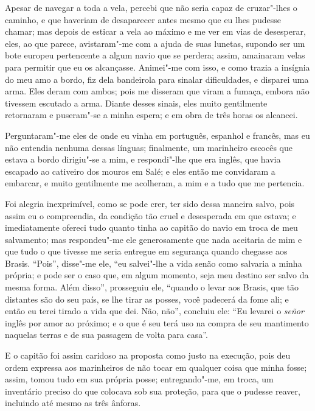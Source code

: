 Apesar de navegar a toda a vela, percebi que não seria capaz de
cruzar"-lhes o caminho, e que haveriam de desaparecer antes mesmo que eu
lhes pudesse chamar; mas depois de esticar a vela ao máximo e me ver em
vias de desesperar, eles, ao que parece, avistaram"-me com a ajuda de
suas lunetas, supondo ser um bote europeu pertencente a algum navio que
se perdera; assim, amainaram velas para permitir que eu os alcançasse.
Animei"-me com isso, e como trazia a insígnia do meu amo a bordo, fiz
dela bandeirola para sinalar dificuldades, e disparei uma arma. Eles
deram com ambos; pois me disseram que viram a fumaça, embora não
tivessem escutado a arma. Diante desses sinais, eles muito gentilmente
retornaram e puseram"-se a minha espera; e em obra de três horas os
alcancei.

Perguntaram"-me eles de onde eu vinha em português, espanhol e francês,
mas eu não entendia nenhuma dessas línguas; finalmente, um marinheiro
escocês que estava a bordo dirigiu"-se a mim, e respondi"-lhe que era
inglês, que havia escapado ao cativeiro dos mouros em Salé; e eles então
me convidaram a embarcar, e muito gentilmente me acolheram, a mim e a
tudo que me pertencia.

Foi alegria inexprimível, como se pode crer, ter sido dessa maneira
salvo, pois assim eu o compreendia, da condição tão cruel e desesperada
em que estava; e imediatamente ofereci tudo quanto tinha ao capitão do
navio em troca de meu salvamento; mas respondeu"-me ele generosamente que
nada aceitaria de mim e que tudo o que tivesse me seria entregue em
segurança quando chegasse aos Brasis. ``Pois'', disse"-me ele, ``eu
salvei"-lhe a vida senão como salvaria a minha própria; e pode ser o caso
que, em algum momento, seja meu destino ser salvo da mesma forma. Além
disso'', prosseguiu ele, ``quando o levar aos Brasis, que tão distantes
são do seu país, se lhe tirar as posses, você padecerá da fome ali; e
então eu terei tirado a vida que dei. Não, não'', concluiu ele: ``Eu
levarei o \emph{señor} inglês por amor ao próximo; e o que é seu terá
uso na compra de seu mantimento naquelas terras e de sua passagem de
volta para casa''.

E o capitão foi assim caridoso na proposta como justo na execução, pois
deu ordem expressa aos marinheiros de não tocar em qualquer coisa que
minha fosse; assim, tomou tudo em sua própria posse; entregando"-me, em
troca, um inventário preciso do que colocava sob sua proteção, para que
o pudesse reaver, incluindo até mesmo as três ânforas.

